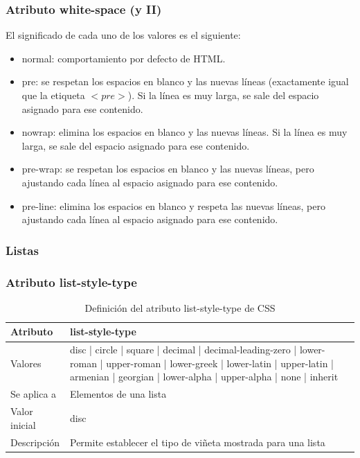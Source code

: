 \documentclass[ucs]{beamer}
\begin{document}
\begin{frame}
\frametitle{Atributo white-space (y II)}

El significado de cada uno de los valores es el siguiente:
\begin{itemize}
  \item normal: comportamiento por defecto de HTML.
  \item pre: se respetan los espacios en blanco y las nuevas líneas (exactamente igual que la etiqueta $<pre>$). Si la línea es muy larga, se sale del espacio asignado para ese contenido.
  \item nowrap: elimina los espacios en blanco y las nuevas líneas. Si la línea es muy larga, se sale del espacio asignado para ese contenido.
  \item pre-wrap: se respetan los espacios en blanco y las nuevas líneas, pero ajustando cada línea al espacio asignado para ese contenido.
  \item pre-line: elimina los espacios en blanco y respeta las nuevas líneas, pero ajustando cada línea al espacio asignado para ese contenido.
\end{itemize}

\end{frame}




\subsubsection*{Listas}

\begin{frame}
\frametitle{Atributo list-style-type}

\begin{center}
  \begin{table}
   \begin{tabular}{p{1.8cm}p{7.8cm}}
Atributo & \bf{list-style-type} \\ \hline
Valores& disc | circle | square | decimal | decimal-leading-zero | lower-roman | upper-roman | lower-greek | lower-latin | upper-latin | armenian | georgian | lower-alpha | upper-alpha | none | inherit \\ \hline
Se aplica a& Elementos de una lista \\ \hline
Valor inicial& disc \\ \hline
Descripción& Permite establecer el tipo de viñeta mostrada para una lista \\ \hline
  \end{tabular}
   \caption{Definición del atributo list-style-type de CSS}
 \end{table}
\end{center}


\end{frame}
\end{document}

